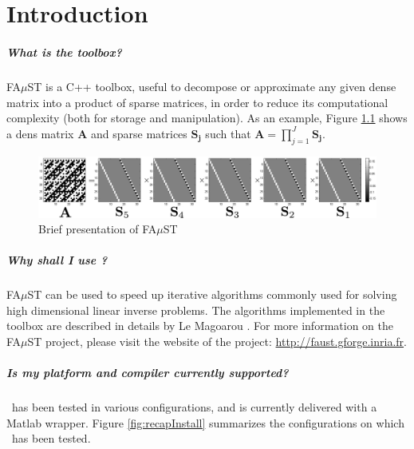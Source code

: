 \chapter{Introduction}\label{sec:intro}

\paragraph{What is the \FAuST toolbox?} FA$\mu$ST is a C++ toolbox, useful to decompose or approximate any given dense matrix into a product of sparse matrices, in order to reduce its computational complexity (both for storage and manipulation). 
As an example, Figure \ref{fig:presentation} shows a dens matrix \textbf{A} and sparse matrices $\mathbf{S_j}$ such that $\mathbf{A}=\prod_{j=1}^J\mathbf{S_j}$.

\begin{figure}[H] %
\centering
\includegraphics[scale=0.5]{images/hadamard32_bw.pdf}
\caption{Brief presentation of FA$\mu$ST}
\label{fig:presentation}
\end{figure}

\paragraph{Why shall I use \FAuST?} FA$\mu$ST can be used to speed up iterative algorithms commonly used for solving high dimensional linear inverse problems. The algorithms implemented in the toolbox are described in details by Le Magoarou \cite{LeMagoarou2016}. For more information on the FA$\mu$ST project, please visit the website of the project: \url{http://faust.gforge.inria.fr}.



\paragraph{Is my platform and compiler currently supported?} 
\FAuST\ has been tested in various configurations, and is currently delivered with a Matlab wrapper. Figure \ref{fig:recapInstall} summarizes the configurations on which \FAuST\ has been tested. 

